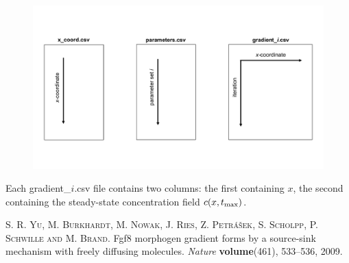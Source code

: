 \documentclass[11pt]{article}
\begin{document}
\begin{figure}[htbp!]
\footnotesize
    \centering
    \captionsetup{width=1.0 \textwidth}
    \includegraphics[width=1.0\textwidth]{./description_csv_files.pdf}
    \caption{}
\label{fig:description_csv_files}
\end{figure}


Each gradient\_$i$.csv file contains two columns: the first containing $x$, the second containing the steady-state concentration field $c(x, t_{\rm{max}})$.


\begin{thebibliography}{9}
  \textsc{S. R. Yu, M. Burkhardt, M. Nowak, J. Ries, Z. Petr\'a\v{s}ek, S. Scholpp, P. Schwille and M. Brand}. Fgf8 morphogen gradient forms by a source-sink mechanism with freely diffusing molecules.
  \emph{Nature} \textbf{volume}(461),
  533--536, 2009.	
\end{thebibliography}
\end{document}
